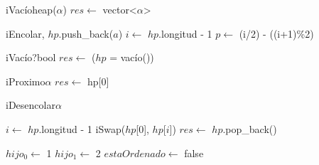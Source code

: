 \begin{Algoritmos}

  \begin{algoritmo}{iVac\'{i}o}{}{heap($\alpha$)}
    $res \gets$ vector<$\alpha$>\;
  \end{algoritmo}

  \begin{algoritmo}{iEncolar}{, }{}
    $hp$.push\_back($a$)\;
     $i \gets$ $hp$.longitud - 1\;
     $p \gets$ (i/2) - ((i+1)\%2)\;
  \end{algoritmo}

  \begin{algoritmo}{iVac\'{i}o?}{}{bool}
    $res \gets$ ($hp$ = vac\'{i}o())\;
  \end{algoritmo}

  \begin{algoritmo}{iProximo}{}{$\alpha$}
    $res \gets$ hp[0]\;
  \end{algoritmo}

  \begin{algoritmo}{iDesencolar}{}{$\alpha$}

     $i \gets$ $hp$.longitud - 1\;
    iSwap($hp$[$0$], $hp$[$i$])\;
    $res \gets$ $hp$.pop\_back()\;

     $hijo_{0} \gets$ 1\;
     $hijo_{1} \gets$ 2\;
     $estaOrdenado \gets$ false\;


\end{algoritmo}
\end{Algoritmos}

